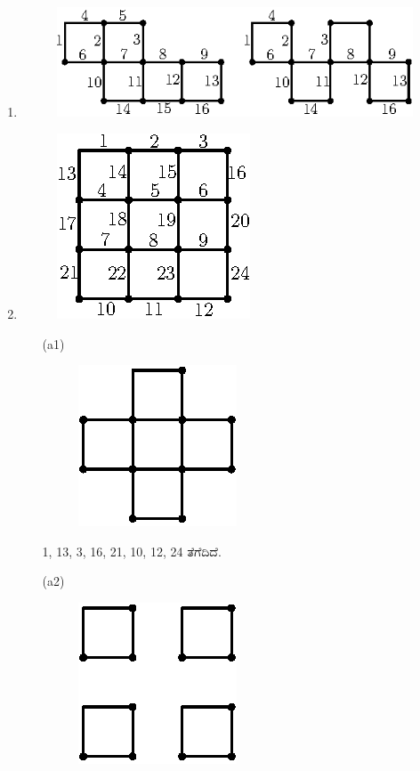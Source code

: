 \begin{enumerate}
\item 
\begin{figure}[H]
\centering
\includegraphics{images/chap11/ans7.eps}
\end{figure}

\item 
\begin{figure}[H]
\centering
\includegraphics{images/chap11/ans8.eps}
\end{figure}
\begin{itemize}
\item[(a1)]  
\begin{figure}[H]
\centering
\includegraphics{images/chap11/ans8a1.eps}
\end{figure}
1, 13, 3, 16, 21, 10, 12, 24 ತೆಗೆದಿದೆ. 
\item[(a2)] 
\begin{figure}[H]
\centering
\includegraphics{images/chap11/ans8a2.eps}

\end{figure}
\end{itemize}
\end{enumerate}
